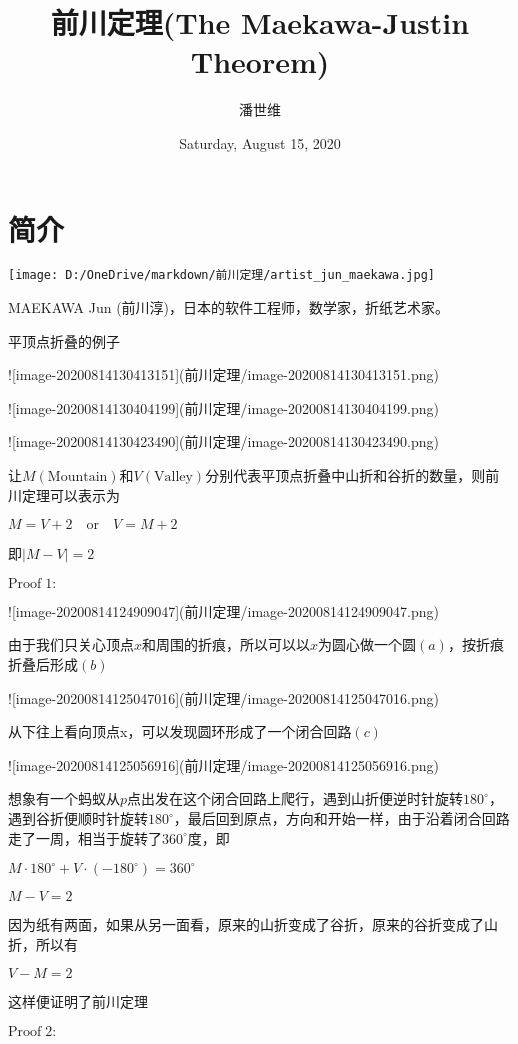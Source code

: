 \documentclass[a4paper,12pt]{article}
\begin{document}
\title {前川定理(The Maekawa-Justin Theorem)}
\author{潘世维}
\date{Saturday, August 15, 2020}
\maketitle
\section{简介} 
\texttt{[image: D:/OneDrive/markdown/前川定理/artist\_jun\_maekawa.jpg]}

MAEKAWA Jun (前川淳)，日本的软件工程师，数学家，折纸艺术家。

平顶点折叠的例子

![image-20200814130413151](前川定理/image-20200814130413151.png)

![image-20200814130404199](前川定理/image-20200814130404199.png)

![image-20200814130423490](前川定理/image-20200814130423490.png)

让$M(\text{Mountain})$和$V(\text{Valley})$分别代表平顶点折叠中山折和谷折的数量，则前川定理可以表示为

$M = V +2 \quad \text{or}\quad V = M + 2$

即$|M-V|=2$

$\text{Proof}\;1:$

![image-20200814124909047](前川定理/image-20200814124909047.png)

由于我们只关心顶点$x$和周围的折痕，所以可以以$x$为圆心做一个圆$(a)$，按折痕折叠后形成$(b)$

![image-20200814125047016](前川定理/image-20200814125047016.png)

从下往上看向顶点x，可以发现圆环形成了一个闭合回路$(c)$

![image-20200814125056916](前川定理/image-20200814125056916.png)

想象有一个蚂蚁从$p$点出发在这个闭合回路上爬行，遇到山折便逆时针旋转$180^{\circ}$，遇到谷折便顺时针旋转$180^{\circ}$，最后回到原点，方向和开始一样，由于沿着闭合回路走了一周，相当于旋转了$360^{\circ}$度，即

$M · 180^{\circ} +V ·(−180^{\circ}) = 360^{\circ}$

$M − V = 2$

因为纸有两面，如果从另一面看，原来的山折变成了谷折，原来的谷折变成了山折，所以有

$V − M = 2$

这样便证明了前川定理

$\text{Proof}\;2:$
\end{document}
